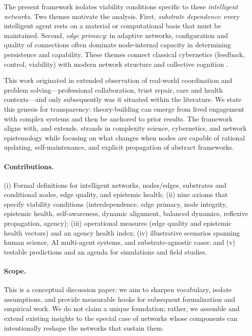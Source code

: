 \documentclass[12pt]{article}
\begin{document}
The present framework isolates viability conditions specific to these \emph{intelligent networks}. Two themes motivate the analysis. First, \emph{substrate dependence}: every intelligent agent rests on a material or computational basis that must be maintained. Second, \emph{edge primacy}: in adaptive networks, configuration and quality of connections often dominate node-internal capacity in determining persistence and capability. These themes connect classical cybernetics (feedback, control, viability) with modern network structure and collective cognition \citep{Ashby1956,Beer1972,Barabasi1999,Zollman2010}.

This work originated in extended observation of real-world coordination and problem solving---professional collaboration, trust repair, care and health contexts---and only subsequently was it situated within the literature. We state this genesis for transparency: theory-building can emerge from lived engagement with complex systems and then be anchored to prior results. The framework aligns with, and extends, strands in complexity science, cybernetics, and network epistemology while focusing on what changes when nodes are capable of rational updating, self-maintenance, and explicit propagation of abstract frameworks.

\paragraph{Contributions.} (i) Formal definitions for intelligent networks, nodes/edges, substrates and conditional nodes, edge quality, and epistemic health; (ii) nine axioms that specify viability conditions (interdependence, edge primacy, node integrity, epistemic health, self-awareness, dynamic alignment, balanced dynamics, reflexive propagation, agency); (iii) operational measures (edge quality and epistemic health vectors) and an agency health index; (iv) illustrative scenarios spanning human science, AI multi-agent systems, and substrate-agnostic cases; and (v) testable predictions and an agenda for simulations and field studies.

\paragraph{Scope.} This is a conceptual discussion paper: we aim to sharpen vocabulary, isolate assumptions, and provide measurable hooks for subsequent formalization and empirical work. We do not claim a unique foundation; rather, we assemble and extend existing insights to the special case of networks whose components can intentionally reshape the networks that sustain them.
\end{document}
